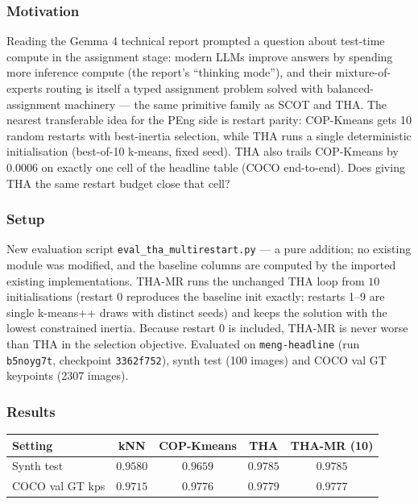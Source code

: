 \subsubsection{Motivation}

Reading the Gemma 4 technical report \cite{gemmateam2026gemma4} prompted a question about test-time compute in the assignment stage: modern LLMs improve answers by spending more inference compute (the report's ``thinking mode''), and their mixture-of-experts routing is itself a typed assignment problem solved with balanced-assignment machinery --- the same primitive family as SCOT and THA. The nearest transferable idea for the PEng side is restart parity: COP-Kmeans gets 10 random restarts with best-inertia selection, while THA runs a single deterministic initialisation (best-of-10 k-means, fixed seed). THA also trails COP-Kmeans by $0.0006$ on exactly one cell of the headline table (COCO end-to-end). Does giving THA the same restart budget close that cell?

\subsubsection{Setup}

New evaluation script \texttt{eval\_tha\_multirestart.py} --- a pure addition; no existing module was modified, and the baseline columns are computed by the imported existing implementations. THA-MR runs the unchanged THA loop from $10$ initialisations (restart 0 reproduces the baseline init exactly; restarts 1--9 are single k-means++ draws with distinct seeds) and keeps the solution with the lowest constrained inertia. Because restart 0 is included, THA-MR is never worse than THA in the selection objective. Evaluated on \texttt{meng-headline} (run \texttt{b5noyg7t}, checkpoint \texttt{3362f752}), synth test (100 images) and COCO val GT keypoints (2307 images).

\subsubsection{Results}

\begin{tabular}{lcccc}
\hline
\textbf{Setting} & \textbf{kNN} & \textbf{COP-Kmeans} & \textbf{THA} & \textbf{THA-MR (10)} \\
\hline
Synth test      & $0.9580$ & $0.9659$ & $\mathbf{0.9785}$ & $0.9785$ \\
COCO val GT kps & $0.9715$ & $0.9776$ & $\mathbf{0.9779}$ & $0.9777$ \\
\hline
\end{tabular}

